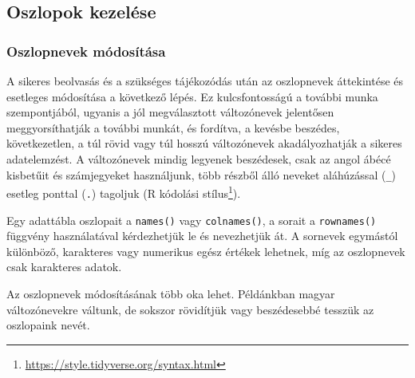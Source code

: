 \documentclass[
]{book}
\DeclareRobustCommand{\href}[2]{#2\footnote{\url{#1}}}
\renewcommand{\href}[2]{#2\footnote{\url{#1}}}
\begin{document}
\hypertarget{oszlopok-kezeluxe9se}{%
\subsection{Oszlopok kezelése}\label{oszlopok-kezeluxe9se}}

\hypertarget{oszlopnevek-muxf3dosuxedtuxe1sa}{%
\subsubsection{Oszlopnevek módosítása}\label{oszlopnevek-muxf3dosuxedtuxe1sa}}

A sikeres beolvasás és a szükséges tájékozódás után az oszlopnevek áttekintése és esetleges módosítása a következő lépés. Ez kulcsfontosságú a további munka szempontjából, ugyanis a jól megválasztott változónevek jelentősen meggyorsíthatják a további munkát, és fordítva, a kevésbe beszédes, következetlen, a túl rövid vagy túl hosszú változónevek akadályozhatják a sikeres adatelemzést. A változónevek mindig legyenek beszédesek, csak az angol ábécé kisbetűit és számjegyeket használjunk, több részből álló neveket aláhúzással (\texttt{\_}) esetleg ponttal (\texttt{.}) tagoljuk (\href{https://style.tidyverse.org/syntax.html}{R kódolási stílus}).

Egy adattábla oszlopait a \texttt{names()} vagy \texttt{colnames()}, a sorait a \texttt{rownames()} függvény használatával kérdezhetjük le és nevezhetjük át. A sornevek egymástól különböző, karakteres vagy numerikus egész értékek lehetnek, míg az oszlopnevek csak karakteres adatok.

Az oszlopnevek módosításának több oka lehet. Példánkban magyar változónevekre váltunk, de sokszor rövidítjük vagy beszédesebbé tesszük az oszlopaink nevét.
\end{document}
